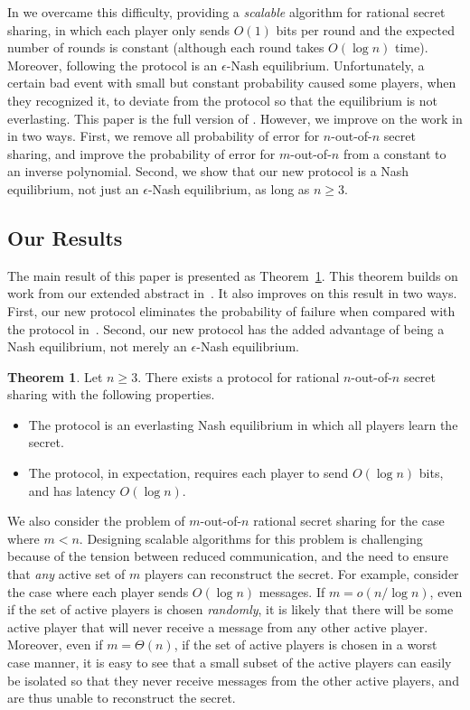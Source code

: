 \documentclass[12pt]{article}
\theoremstyle{definition}
\newtheorem{theorem}{Theorem}
\begin{document}
In \cite{RSSpodc11} we overcame this difficulty, providing a
\emph{scalable} algorithm for rational secret sharing, in which each
player only sends $O(1)$ bits per round and the expected number of
rounds is constant (although each round takes $O(\log n)$
time). Moreover, following the protocol is an $\epsilon$-Nash
equilibrium. Unfortunately, a certain bad event with small but
constant probability caused some players, when they recognized it, to
deviate from the protocol so that the equilibrium is not everlasting.
This paper is the full version of \cite{RSSpodc11}.  However, we
improve on the work in \cite{RSSpodc11} in two ways.  First, we remove
all probability of error for $n$-out-of-$n$ secret sharing, and
improve the probability of error for $m$-out-of-$n$ from a constant to
an inverse polynomial.  Second, we show that our new protocol is a
Nash equilibrium, not just an $\epsilon$-Nash equilibrium, as long as
$n \geq 3$.

\subsection{Our Results}

The main result of this paper is presented as Theorem~\ref{thm:main}.
This theorem builds on work from our extended abstract
in~\cite{RSSpodc11}.  It also improves on this result in two ways.
First, our new protocol eliminates the probability of failure when
compared with the protocol in~\cite{RSSpodc11}.  Second, our new
protocol has the added advantage of being a Nash equilibrium, not
merely an $\epsilon$-Nash equilibrium.
 
\begin{theorem}\label{thm:main}
Let $n\ge 3$. There exists a protocol for rational $n$-out-of-$n$
secret sharing with the following properties.
\begin{itemize}
\item The protocol is an everlasting Nash equilibrium in which all
  players learn the secret.
\item The protocol, in expectation, requires each player to send
  $O(\log n)$ bits, and has latency $O(\log n)$.
\end{itemize}
\label{thm:nofn}
\end{theorem}

We also consider the problem of $m$-out-of-$n$ rational secret sharing
for the case where $m<n$.  Designing scalable algorithms for this
problem is challenging because of the tension between reduced
communication, and the need to ensure that \emph{any} active set of
$m$ players can reconstruct the secret.  For example, consider the
case where each player sends $O(\log n)$ messages.  If $m = o(n/ \log
n)$, even if the set of active players is chosen \emph{randomly}, it
is likely that there will be some active player that will never
receive a message from any other active player.  Moreover, even if
$m=\Theta(n)$, if the set of active players is chosen in a worst case
manner, it is easy to see that a small subset of the active players
can easily be isolated so that they never receive messages from the
other active players, and are thus unable to reconstruct the secret.
\end{document}
